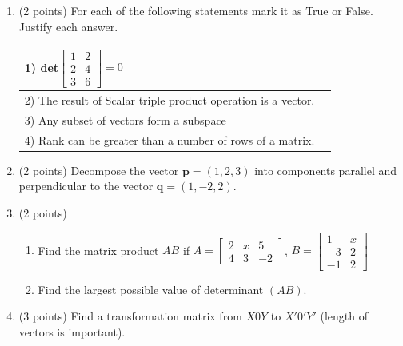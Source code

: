\documentclass[]{exam}
\begin{document}
\begin{enumerate}

\item (2 points) For each of the following statements mark it as True or False. Justify each answer.
\smallskip


\begin{tabular}[b]{p{11cm}|p{2cm}}
\vspace{-0.8cm}

   1)  det$\begin{bmatrix}
   1 & 2 \\
   2 & 4 \\ 
   3 & 6 
   \end{bmatrix} = 0$ &    \\ 
  \hline
    2) The result of Scalar triple product operation is a vector. & \\
    \hline
    3) Any subset of vectors form a subspace & \\
    \hline
    4) Rank can be greater than a number of rows of a matrix. & \\
    \hline
    \end{tabular}

\item (2 points) Decompose the vector $\textbf{p} = (1, 2, 3)$ into components parallel and perpendicular to the vector $\textbf{q} = (1, -2, 2)$.

\item (2 points)
\vspace{-0.7cm} 
\begin{enumerate}
    \item Find the matrix product $AB$ if $A=\begin{bmatrix}2 & x & 5 \\ 4 & 3 & -2 \end{bmatrix}$, $B=\begin{bmatrix} 1 & x \\ -3 & 2 \\ -1 & 2 \end{bmatrix}$
    \item Find the largest possible value of determinant $(AB)$.
\end{enumerate}

\item (3 points) Find a transformation matrix from $X0Y$ to $X'0'Y'$ (length of vectors is important).


\end{enumerate}
\end{document}
